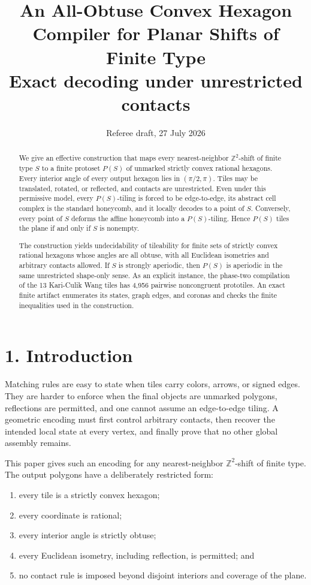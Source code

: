 \documentclass[11pt]{article}
\title{An All-Obtuse Convex Hexagon Compiler for Planar Shifts of Finite Type\\[0.4em]\large Exact decoding under unrestricted contacts}
\author{}
\date{Referee draft, 27 July 2026}
\begin{document}
\maketitle


\begin{abstract}

We give an effective construction that maps every nearest-neighbor
\(\mathbb Z^2\)-shift of finite type \(S\) to a finite protoset \(P(S)\) of
unmarked strictly convex rational hexagons. Every interior angle of every
output hexagon lies in \((\pi/2,\pi)\). Tiles may be translated, rotated, or
reflected, and contacts are unrestricted. Even under this permissive model,
every \(P(S)\)-tiling is forced to be edge-to-edge, its abstract cell complex
is the standard honeycomb, and it locally decodes to a point of \(S\).
Conversely, every point of \(S\) deforms the affine honeycomb into a
\(P(S)\)-tiling. Hence \(P(S)\) tiles the plane if and only if \(S\) is
nonempty.

The construction yields undecidability of tileability for finite sets of
strictly convex rational hexagons whose angles are all obtuse, with all
Euclidean isometries and arbitrary contacts allowed. If \(S\) is strongly
aperiodic, then \(P(S)\) is aperiodic in the same unrestricted shape-only
sense. As an explicit instance, the phase-two compilation of the 13
Kari-Culik Wang tiles has 4,956 pairwise noncongruent prototiles. An exact
finite artifact enumerates its states, graph edges, and coronas and checks
the finite inequalities used in the construction.

\end{abstract}
\section*{1. Introduction}

Matching rules are easy to state when tiles carry colors, arrows, or signed
edges. They are harder to enforce when the final objects are unmarked
polygons, reflections are permitted, and one cannot assume an edge-to-edge
tiling. A geometric encoding must first control arbitrary contacts, then
recover the intended local state at every vertex, and finally prove that no
other global assembly remains.

This paper gives such an encoding for any nearest-neighbor
\(\mathbb Z^2\)-shift of finite type. The output polygons have a deliberately
restricted form:

\begin{enumerate}
\item every tile is a strictly convex hexagon;
\item every coordinate is rational;
\item every interior angle is strictly obtuse;
\item every Euclidean isometry, including reflection, is permitted; and
\item no contact rule is imposed beyond disjoint interiors and coverage of the
   plane.
\end{enumerate}
\end{document}
